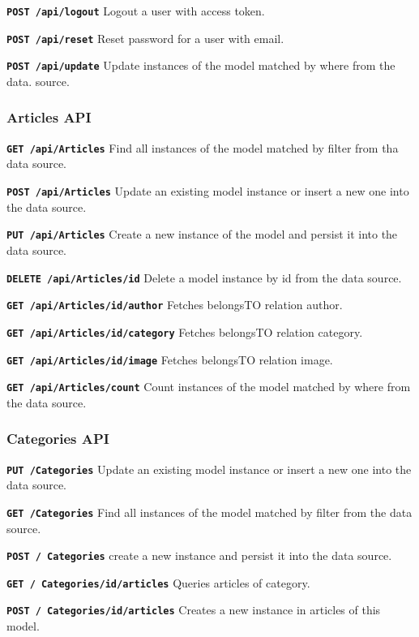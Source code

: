 \texttt{\textbf{POST /api/logout}} Logout a user with access token.

\texttt{\textbf{POST /api/reset}} Reset password for a user with email.

\texttt{\textbf{POST /api/update}} Update instances of the model matched by where from the data. source.

	
\subsubsection{Articles API}

\texttt{\textbf{GET /api/Articles}} Find all instances of the model matched by filter from tha data source.

\texttt{\textbf{POST /api/Articles}} Update an existing model instance or insert a new one into the data source.

\texttt{\textbf{PUT /api/Articles}} Create a new instance of the model and persist it into the data source.

\texttt{\textbf{DELETE /api/Articles/{id}}} Delete a model instance by id from the data source.

\texttt{\textbf{GET /api/Articles/{id}/author}} Fetches belongsTO relation author.

\texttt{\textbf{GET /api/Articles/{id}/category}} Fetches belongsTO relation category.

\texttt{\textbf{GET /api/Articles/{id}/image}} Fetches belongsTO relation image.

\texttt{\textbf{GET /api/Articles/count}} Count instances of the model matched by where from the data source.


\subsubsection{Categories API}

\texttt{\textbf{PUT /Categories}} Update an existing model instance or insert a new one into the data source.

\texttt{\textbf{GET /Categories}} Find all instances of the model matched by filter from the data source.

\texttt{\textbf{POST / Categories}} create a new instance and persist it into the data source.

\texttt{\textbf{GET / Categories/{id}/articles}} Queries articles of category.

\texttt{\textbf{POST / Categories/{id}/articles}} Creates a new instance in articles of this model.

